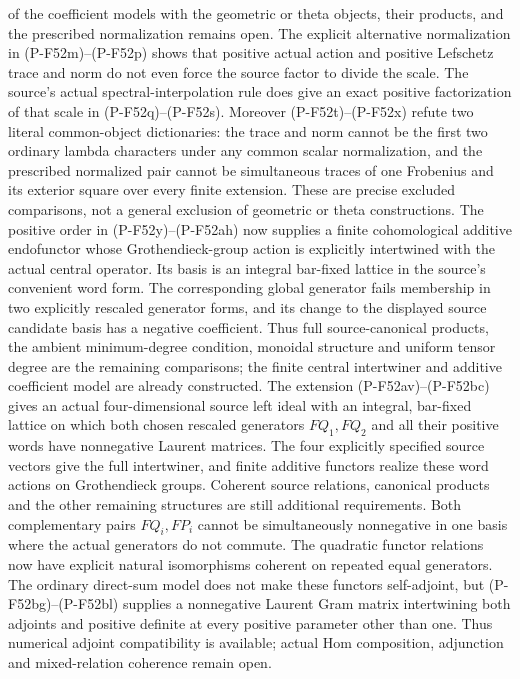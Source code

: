 \documentclass[11pt,a4paper]{article}
\begin{document}
\begin{description}
of the coefficient models with the geometric or theta objects,
their products, and the prescribed normalization remains open.
The explicit alternative normalization in (P-F52m)--(P-F52p)
shows that positive actual action and positive Lefschetz trace
and norm do not even force the source factor to divide the scale.
The source's actual spectral-interpolation rule does give an
exact positive factorization of that scale in (P-F52q)--(P-F52s).
Moreover (P-F52t)--(P-F52x) refute two literal common-object
dictionaries: the trace and norm cannot be the first two ordinary
lambda characters under any common scalar normalization, and
the prescribed normalized pair cannot be simultaneous traces of
one Frobenius and its exterior square over every finite extension.
These are precise excluded comparisons, not a general exclusion
of geometric or theta constructions.
The positive order in (P-F52y)--(P-F52ah) now supplies a finite
cohomological additive endofunctor whose Grothendieck-group action
is explicitly intertwined with the actual central operator.
Its basis is an integral bar-fixed lattice in the source's
convenient word form. The corresponding global generator fails
membership in two explicitly rescaled generator forms, and its
change to the displayed source candidate basis has a negative
coefficient. Thus full source-canonical products, the ambient
minimum-degree condition, monoidal structure and uniform tensor
degree are the remaining comparisons; the finite central
intertwiner and additive coefficient model are already constructed.
The extension (P-F52av)--(P-F52bc) gives an actual
four-dimensional source left ideal with an integral, bar-fixed
lattice on which both chosen rescaled generators $FQ_1,FQ_2$
and all their positive words have nonnegative Laurent matrices.
The four explicitly specified source vectors give the full
intertwiner, and finite additive functors realize these word
actions on Grothendieck groups. Coherent source relations,
canonical products and the other remaining structures are
still additional requirements. Both complementary pairs
$FQ_i,FP_i$ cannot be simultaneously nonnegative in one
basis where the actual generators do not commute.
The quadratic functor relations now have explicit natural
isomorphisms coherent on repeated equal generators.
The ordinary direct-sum model does not make these functors
self-adjoint, but (P-F52bg)--(P-F52bl) supplies a nonnegative
Laurent Gram matrix intertwining both adjoints and positive
definite at every positive parameter other than one. Thus
numerical adjoint compatibility is available; actual Hom
composition, adjunction and mixed-relation coherence remain open.


\end{description}
\end{document}

